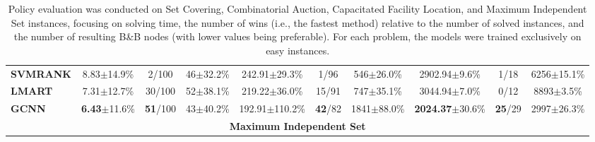 \begin{table*}[htb!]
\begin{footnotesize}
\begin{tabular}{|l c c c c c c c c c|}
        \textbf{SVMRANK} & 8.83$\pm$14.9\% & 2/100 & 46$\pm$32.2\% & 242.91$\pm$29.3\% & 1/96 & 546$\pm$26.0\% & 2902.94$\pm$9.6\% & 1/18 & 6256$\pm$15.1\%\\
        \textbf{LMART} & 7.31$\pm$12.7\% & 30/100 & 52$\pm$38.1\% & 219.22$\pm$36.0\% & 15/91 & 747$\pm$35.1\% & 3044.94$\pm$7.0\% & 0/12 & 8893$\pm$3.5\%\\
        \textbf{GCNN} & \textbf{6.43}$\pm$11.6\% & \textbf{51}/100 & 43$\pm$40.2\% & 192.91$\pm$110.2\% & \textbf{42}/82 & 1841$\pm$88.0\% & \textbf{2024.37}$\pm$30.6\% & \textbf{25}/29 & 2997$\pm$26.3\%\\
        \multicolumn{10}{|c|}{\textbf{Maximum Independent Set}}\\
        \hline
    \end{tabular}
    \end{footnotesize}
    \caption{Policy evaluation was conducted on Set Covering, Combinatorial Auction, Capacitated Facility Location, and Maximum Independent Set instances, focusing on solving time, the number of wins (i.e., the fastest method) relative to the number of solved instances, and the number of resulting B\&B nodes (with lower values being preferable).
    For each problem, the models were trained exclusively on easy instances.}
    \label{tab:gasse-results}
\end{table*}